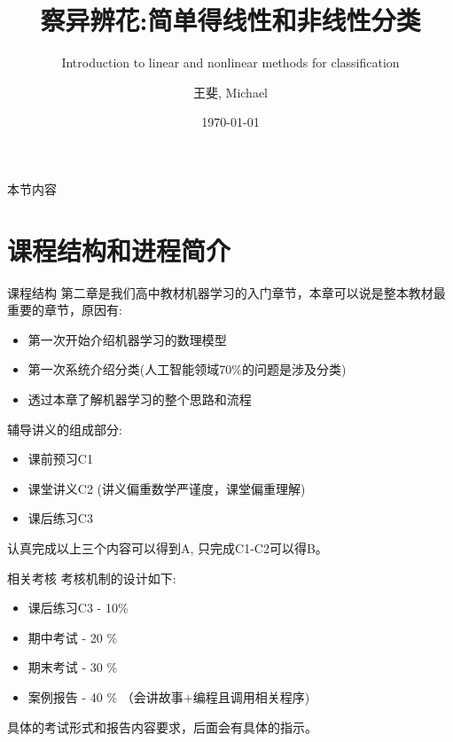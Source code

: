 \documentclass[handout]{ctexbeamer}
\title[]{察异辨花:简单得线性和非线性分类}
\subtitle{Introduction to linear and nonlinear methods for classification}
\date{\today}
\author[王斐]{王斐, Michael}
\institute[SenseTime, Edu]{SenseTime Edu \and Math, Economics, Philosophy (UCD, Nottingham, CUHK) \and \url{https://github.com/Michael-yunfei/MDLforBeginners}}
\begin{document}



\begin{frame}[noframenumbering]
  \titlepage
\end{frame}



\begin{frame}{本节内容}
	\tableofcontents
\end{frame}

\section{课程结构和进程简介}

\begin{frame}{课程结构}
第二章是我们高中教材机器学习的入门章节，本章可以说是整本教材最重要的章节，原因有:
\begin{itemize}
\setlength\itemsep{1em}
	\item 第一次开始介绍机器学习的数理模型
	\item 第一次系统介绍分类(人工智能领域70\%的问题是涉及分类)
	\item 透过本章了解机器学习的整个思路和流程
\end{itemize}

\hfil

辅导讲义的组成部分:
\begin{itemize}
\setlength\itemsep{1em}
	\item 课前预习C1 
	\item 课堂讲义C2 (讲义偏重数学严谨度，课堂偏重理解)
	\item 课后练习C3
\end{itemize}

\hfil 

认真完成以上三个内容可以得到A, 只完成C1-C2可以得B。
\end{frame}

\begin{frame}{相关考核}
	考核机制的设计如下:
	
	\hfil
	
	\begin{itemize}
	\setlength\itemsep{1em}
		\item 课后练习C3 - 10\% 
		\item 期中考试 - 20 \% 
		\item 期末考试 - 30 \%
		\item 案例报告 - 40 \% （会讲故事+编程且调用相关程序)
	\end{itemize}
	
	\hfil 
	
	具体的考试形式和报告内容要求，后面会有具体的指示。
\end{frame}
\end{document}
